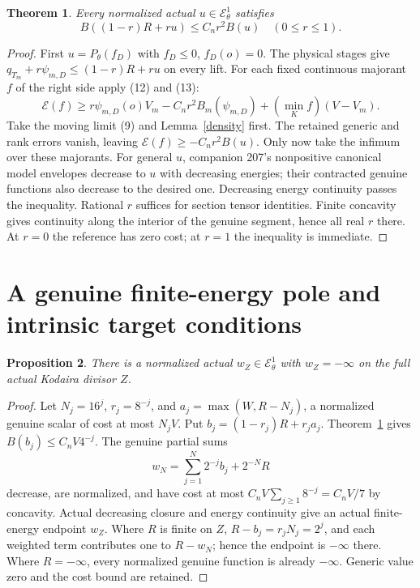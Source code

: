 \documentclass[11pt]{article}
\newtheorem{theorem}{Theorem}
\newtheorem{proposition}[theorem]{Proposition}
\newcommand{\EE}{\mathcal E^1_\theta}
\begin{document}
\begin{theorem}\label{contraction}
Every normalized actual $u\in\EE$ satisfies
\[
           B((1-r)R+ru)\leq C_n r^2 B(u)
                         \quad(0\leq r\leq1).          \tag{14}
\]
\end{theorem}
\begin{proof}
First $u=P_\theta(f_D)$ with $f_D\leq0$, $f_D(o)=0$.
The physical stages give
$q_{T_m}+r\psi_{m,D}\leq(1-r)R+ru$ on every lift.
For each fixed continuous majorant $f$ of the right side apply
(12) and (13):
\[
 \mathscr E(f)\geq
       r\psi_{m,D}(o)V_m-C_n r^2 B_m(\psi_{m,D})
                         +(\min_K f)(V-V_m).
\]
Take the moving limit (9) and Lemma~\ref{density} first.
The retained generic and rank errors vanish, leaving
$\mathscr E(f)\geq-C_n r^2 B(u)$.
Only now take the infimum over these majorants.
For general $u$, companion 207's nonpositive canonical model
envelopes decrease to $u$ with decreasing energies; their
contracted genuine functions also decrease to the desired one.
Decreasing energy continuity passes the inequality.
Rational $r$ suffices for section tensor identities.
Finite concavity gives continuity along the interior of the
genuine segment, hence all real $r$ there. At $r=0$ the reference
has zero cost; at $r=1$ the inequality is immediate.
\end{proof}

\section{A genuine finite-energy pole and intrinsic target conditions}
\begin{proposition}\label{pole}
There is a normalized actual $w_Z\in\EE$ with $w_Z=-\infty$ on
the full actual Kodaira divisor $Z$.
\end{proposition}
\begin{proof}
Let $N_j=16^j$, $r_j=8^{-j}$, and
$a_j=\max(W,R-N_j)$, a normalized genuine scalar of cost at most
$N_jV$. Put $b_j=(1-r_j)R+r_j a_j$.
Theorem~\ref{contraction} gives $B(b_j)\leq C_nV4^{-j}$.
The genuine partial sums
\[
               w_N=\sum_{j=1}^N2^{-j}b_j+2^{-N}R
\]
decrease, are normalized, and have cost at most
$C_nV\sum_{j\geq1}8^{-j}=C_nV/7$ by concavity.
Actual decreasing closure and energy continuity give an actual
finite-energy endpoint $w_Z$. Where $R$ is finite on $Z$,
$R-b_j=r_jN_j=2^j$, and each weighted term contributes one
to $R-w_N$; hence the endpoint is $-\infty$ there.
Where $R=-\infty$, every normalized genuine function is already
$-\infty$. Generic value zero and the cost bound are retained.
\end{proof}
\end{document}

